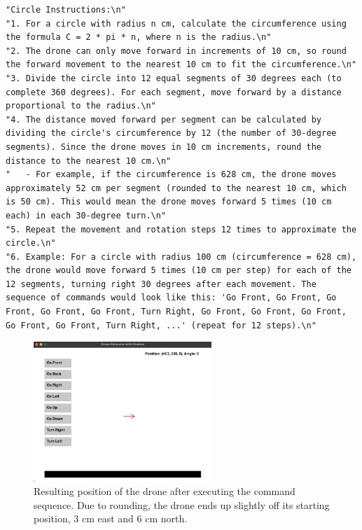 \begin{lstlisting}[caption={Prompt Engineering Circle Instructions}, label={lst:circle_instructions}]
"Circle Instructions:\n"
"1. For a circle with radius n cm, calculate the circumference using the formula C = 2 * pi * n, where n is the radius.\n"
"2. The drone can only move forward in increments of 10 cm, so round the forward movement to the nearest 10 cm to fit the circumference.\n"
"3. Divide the circle into 12 equal segments of 30 degrees each (to complete 360 degrees). For each segment, move forward by a distance proportional to the radius.\n"
"4. The distance moved forward per segment can be calculated by dividing the circle's circumference by 12 (the number of 30-degree segments). Since the drone moves in 10 cm increments, round the distance to the nearest 10 cm.\n"
"   - For example, if the circumference is 628 cm, the drone moves approximately 52 cm per segment (rounded to the nearest 10 cm, which is 50 cm). This would mean the drone moves forward 5 times (10 cm each) in each 30-degree turn.\n"
"5. Repeat the movement and rotation steps 12 times to approximate the circle.\n"
"6. Example: For a circle with radius 100 cm (circumference = 628 cm), the drone would move forward 5 times (10 cm per step) for each of the 12 segments, turning right 30 degrees after each movement. The sequence of commands would look like this: 'Go Front, Go Front, Go Front, Go Front, Go Front, Turn Right, Go Front, Go Front, Go Front, Go Front, Go Front, Turn Right, ...' (repeat for 12 steps).\n"
\end{lstlisting}

\begin{figure}[H]
    \centering
    \includegraphics[width=0.6\textwidth]{img/sim_pos_circle.jpeg}
    \caption{Resulting position of the drone after executing the command sequence. Due to rounding, the drone ends up slightly off its starting position, 3 cm east and 6 cm north.}
    \label{fig:sim_pos_circle}
\end{figure}

